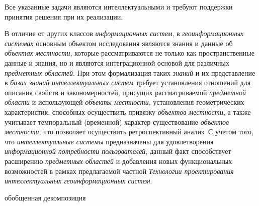 Все указанные задачи являются интеллектуальными и требуют поддержки принятия решения при их реализации.

В отличие от других классов \textit{информационных систем}, в \textit{геоинформационных системах} основным объектом исследования являются знания и данные об \textit{объектах местности}, которые рассматриваются не только как пространственные данные и знания, но и являются интеграционной основой для различных \textit{предметных областей}. При этом формализация таких \textit{знаний} и их представление в \textit{базах знаний} \textit{интеллектуальных систем} требует установления отношений для описания свойств и закономерностей, присущих рассматриваемой \textit{предметной области} и использующей \textit{объекты местности}, установления геометрических характеристик, способных осуществить привязку \textit{объектов местности}, а также учитывает темпоральный (временной) характер существование \textit{объектов местности}, что позволяет осуществить ретроспективный анализ. С учетом того, что \textit{интеллектуальные системы} предназначены для удовлетворения \textit{информационной потребности пользователей}, данный факт способствует расширению \textit{предметных областей} и добавления новых функциональных возможностей в рамках предлагаемой частной \textit{Технологии проектирования интеллектуальных геоинформационных систем}.

\begin{SCn}
\begin{scnindent}
	\begin{scnrelfromset}{обобщенная декомпозиция}
	\end{scnrelfromset}
\end{scnindent}
\end{SCn}

